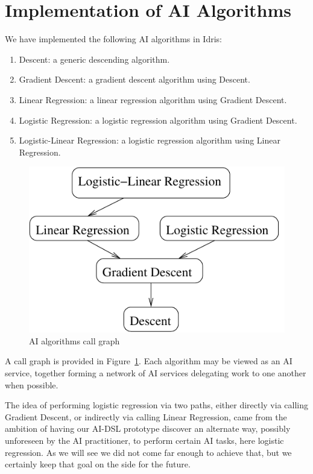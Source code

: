\documentclass[]{report}
\begin{document}
\section{Implementation of AI Algorithms}
We have implemented the following AI algorithms in Idris:
\begin{enumerate}
\item Descent: a generic descending algorithm.
\item Gradient Descent: a gradient descent algorithm using Descent.
\item Linear Regression: a linear regression algorithm using Gradient
  Descent.
\item Logistic Regression: a logistic regression algorithm using
  Gradient Descent.
\item Logistic-Linear Regression: a logistic regression algorithm
  using Linear Regression.
\end{enumerate}
\begin{figure}[H]
  \centering
  \includegraphics[scale=0.8]{figs/ai-algorithms.xfig.pdf}
  \caption{AI algorithms call graph}
  \label{fig:ai_algorithms}
\end{figure}
A call graph is provided in Figure~\ref{fig:ai_algorithms}.  Each
algorithm may be viewed as an AI service, together forming a network
of AI services delegating work to one another when possible.

The idea of performing logistic regression via two paths, either
directly via calling Gradient Descent, or indirectly via calling
Linear Regression, came from the ambition of having our AI-DSL
prototype discover an alternate way, possibly unforeseen by the AI
practitioner, to perform certain AI tasks, here logistic regression.
As we will see we did not come far enough to achieve that, but we
certainly keep that goal on the side for the future.
\end{document}
